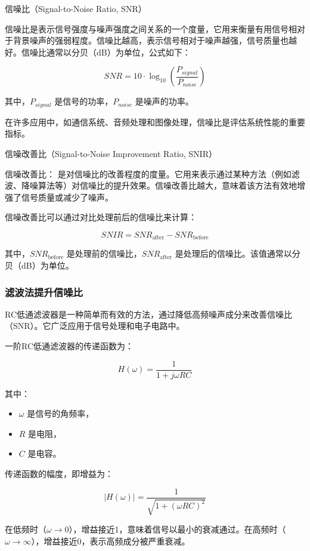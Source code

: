 \documentclass[dvipsnames, svgnames,a4paper,11pt]{article}
\begin{document}
信噪比（Signal-to-Noise Ratio, SNR）

信噪比是表示信号强度与噪声强度之间关系的一个度量，它用来衡量有用信号相对于背景噪声的强弱程度。信噪比越高，表示信号相对于噪声越强，信号质量也越好。信噪比通常以分贝（dB）为单位，公式如下：

\[
SNR = 10 \cdot \log_{10} \left( \frac{P_{signal}}{P_{noise}} \right)
\]

其中，\(P_{signal}\) 是信号的功率，\(P_{noise}\) 是噪声的功率。

在许多应用中，如通信系统、音频处理和图像处理，信噪比是评估系统性能的重要指标。

信噪改善比（Signal-to-Noise Improvement Ratio, SNIR）

信噪改善比： 是对信噪比的改善程度的度量。它用来表示通过某种方法（例如滤波、降噪算法等）对信噪比的提升效果。信噪改善比越大，意味着该方法有效地增强了信号质量或减少了噪声。

信噪改善比可以通过对比处理前后的信噪比来计算：

\[
SNIR = SNR_{\text{after}} - SNR_{\text{before}}
\]

其中，\(SNR_{\text{before}}\) 是处理前的信噪比，\(SNR_{\text{after}}\) 是处理后的信噪比。该值通常以分贝（dB）为单位。


\subsubsection{滤波法提升信噪比}

RC低通滤波器是一种简单而有效的方法，通过降低高频噪声成分来改善信噪比（SNR）。它广泛应用于信号处理和电子电路中。


一阶RC低通滤波器的传递函数为：

\begin{equation}
H(\omega) = \frac{1}{1 + j\omega RC}
\end{equation}

其中：
\begin{itemize}
    \item \( \omega \) 是信号的角频率，
    \item \( R \) 是电阻，
    \item \( C \) 是电容。
\end{itemize}

传递函数的幅度，即增益为：

\begin{equation}
|H(\omega)| = \frac{1}{\sqrt{1 + (\omega RC)^2}}
\end{equation}

在低频时（\( \omega \rightarrow 0 \)），增益接近1，意味着信号以最小的衰减通过。在高频时（\( \omega \rightarrow \infty \)），增益接近0，表示高频成分被严重衰减。
\end{document}
